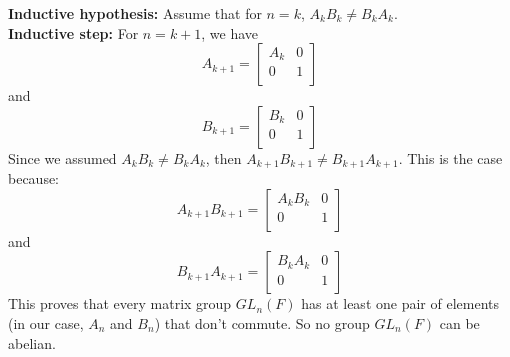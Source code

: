 \documentclass{article}
\begin{document}
    \textbf{Inductive hypothesis:} Assume that for $n = k$,
    $A_kB_k \neq B_kA_k$. \\
    \textbf{Inductive step:} For $n = k + 1$, we have
    \[ A_{k+1} =
    \begin{bmatrix}
    A_k & 0 \\
    0 & 1 \\
    \end{bmatrix}\]
    and 
    \[ B_{k+1} =
    \begin{bmatrix}
    B_k & 0 \\
    0 & 1 \\
    \end{bmatrix} \]
    Since we assumed $A_kB_k \neq B_kA_k$,
    then $A_{k+1}B_{k+1} \neq B_{k+1}A_{k+1}$.
    This is the case because:
    \[ A_{k+1}B_{k+1} = 
    \begin{bmatrix}
    A_kB_k & 0 \\
    0 & 1 \\
    \end{bmatrix}\]
    and 
    \[ B_{k+1}A_{k+1} =
    \begin{bmatrix}
    B_kA_k & 0 \\
    0 & 1 \\
    \end{bmatrix}\]
    This proves that every matrix group $GL_n(F)$ has at least one
    pair of elements (in our case, $A_n$ and $B_n$) that don't commute.
    So no group $GL_n(F)$ can be abelian.
\end{document}
